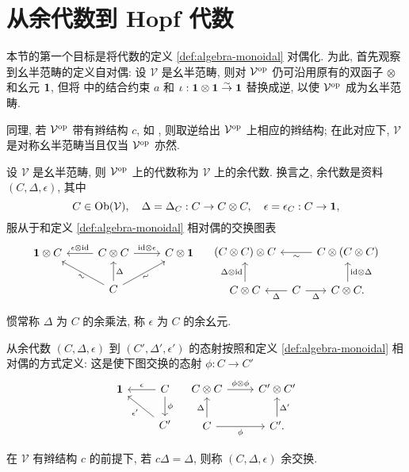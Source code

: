 \section{从余代数到 Hopf 代数}\label{sec:bialgebra}
本节的第一个目标是将代数的定义 \ref{def:algebra-monoidal} 对偶化. 为此, 首先观察到幺半范畴的定义自对偶: 设 $\mathcal{V}$ 是幺半范畴, 则对 $\mathcal{V}^{\operatorname{op}}$ 仍可沿用原有的双函子 $\otimes$ 和幺元 $\bm{1}$, 但将 \cite[定义 3.1.1]{Li1} 中的结合约束 $a$ 和 $\iota: \bm{1} \otimes \bm{1} \stackrel{\sim}{\rightarrow} \bm{1}$ 替换成逆, 以使 $\mathcal{V}^{\operatorname{op}}$ 成为幺半范畴.

同理, 若 $\mathcal{V}^{\operatorname{op}}$ 带有辫结构 $c$, 如 \cite[定义 3.3.1]{Li1}, 则取逆给出 $\mathcal{V}^{\operatorname{op}}$ 上相应的辫结构; 在此对应下, $\mathcal{V}$ 是对称幺半范畴当且仅当 $\mathcal{V}^{\operatorname{op}}$ 亦然.

\begin{definition}[余代数]\label{def:cogebra-monoidal}
	设 $\mathcal{V}$ 是幺半范畴, 则 $\mathcal{V}^{\operatorname{op}}$ 上的代数称为 $\mathcal{V}$ 上的余代数. 换言之, 余代数是资料 $(C, \Delta, \epsilon)$, 其中
	\[ C \in \operatorname{Ob}(\mathcal{V}), \quad \Delta = \Delta_C: C \to C \otimes C, \quad \epsilon = \epsilon_C: C \to \bm{1}, \]
	服从于和定义 \ref{def:algebra-monoidal} 相对偶的交换图表
	\[\begin{tikzcd}
			\munit \otimes C & C \otimes C \arrow[r, "{\identity \otimes \epsilon}"] \arrow[l, "{\epsilon \otimes \identity}"'] & C \otimes \munit \\
			& C \arrow[lu, "\sim"' sloped] \arrow[ru, "\sim"' sloped] \arrow[u, "\Delta"'] &
	\end{tikzcd} \quad
	\begin{tikzcd}[column sep=tiny]
		(C \otimes C) \otimes C & & C \otimes (C \otimes C) \arrow[ll, "\sim"] \\
		C \otimes C \arrow[u, "{\Delta \otimes \identity}"] & C \arrow[l, "\Delta"] \arrow[r, "\Delta"'] & C \otimes C . \arrow[u, "{\identity \otimes \Delta}"']
	\end{tikzcd}\]

	惯常称 $\Delta$ 为 $C$ 的余乘法, 称 $\epsilon$ 为 $C$ 的余幺元.
	
	从余代数 $(C, \Delta, \epsilon)$ 到 $(C', \Delta', \epsilon')$ 的态射按照和定义 \ref{def:algebra-monoidal} 相对偶的方式定义: 这是使下图交换的态射 $\phi: C \to C'$
	\[\begin{tikzcd}
		\munit & C \arrow[d, "\phi"] \arrow[l, "\epsilon"']  \\
		& C' \arrow[lu, "{\epsilon'}"]
	\end{tikzcd} \quad \begin{tikzcd}
		C \otimes C \arrow[r, "{\phi \otimes \phi}"] & C' \otimes C' \\
		C \arrow[r, "\phi"'] \arrow[u, "\Delta"] & C' . \arrow[u, "{\Delta'}"']
	\end{tikzcd}\]
	
	在 $\mathcal{V}$ 有辫结构 $c$ 的前提下, 若 $c \Delta = \Delta$, 则称 $(C, \Delta, \epsilon)$ 余交换.
\end{definition}

